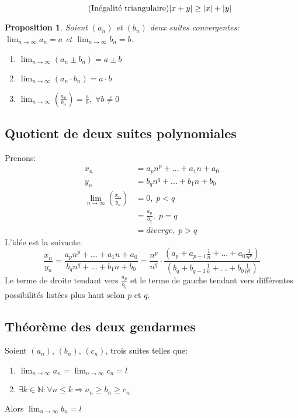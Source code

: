 \documentclass[10pt,a4paper]{book}
\newcommand{\N}{\mathbb{N}}
\DeclarePairedDelimiter\abs{\lvert}{\rvert}
\newtheorem{proposition}{Proposition}[section]
\begin{document}
\begin{equation*} \tag{Inégalité triangulaire}
\abs{x+y} \geq \abs{x} + \abs{y}
\end{equation*}

\begin{proposition}
Soient $(a_n)$ et $(b_n)$ deux suites convergentes: $\lim_{n\rightarrow \infty}a_n=a$ et $\lim_{n\rightarrow \infty}b_n=b$.
\begin{enumerate}
\item $\lim_{n\rightarrow \infty}(a_n \pm b_n) = a\pm b$
\item $\lim_{n\rightarrow \infty}(a_n \cdot b_n) = a\cdot b$
\item $\lim_{n\rightarrow \infty}(\frac{a_n}{b_n}) = \frac{a}{b}, \; \forall b \neq 0$
\end{enumerate}
\end{proposition}


\subsection{Quotient de deux suites polynomiales}

Prenons:
\begin{equation*}
\begin{split}
x_n &= a_pn^p +...+ a_1n + a_0 \\
y_n &= b_qn^q +...+ b_1n + b_0 \\
\lim_{n\rightarrow \infty} \left(\frac{x_n}{y_n}\right) &= 0,\; p < q \\
&= \frac{a_p}{b_q},\; p = q \\
&= diverge,\; p > q
\end{split}
\end{equation*}
L'idée est la suivante:
\begin{equation*}
\frac{x_n}{y_n} = \frac{a_pn^p+...+a_1n+a_0}{b_qn^q+...+b_1n+b_0} = \frac{n^p}{n^q}\cdot \frac{(a_p + a_{p-1}\frac{1}{n}+...+a_0\frac{1}{n^p})}{(b_q + b_{q-1}\frac{1}{n}+...+b_0\frac{1}{n^q})}
\end{equation*}
Le terme de droite tendant vers $\frac{a_p}{b_q}$ et le terme de gauche tendant vers différentes possibilités listées plus haut selon $p$ et $q$.

\subsection{Théorème des deux gendarmes}
Soient $(a_n)$, $(b_n)$, $(c_n)$, trois suites telles que:
\begin{enumerate}
\item $\lim_{n\rightarrow \infty}a_n =\lim_{n\rightarrow \infty}c_n = l$
\item $\exists k\in \N : \forall n \leq k \Rightarrow a_n \geq b_n \geq c_n$
\end{enumerate}
Alors $\lim_{n\rightarrow \infty}b_n = l$
\end{document}

